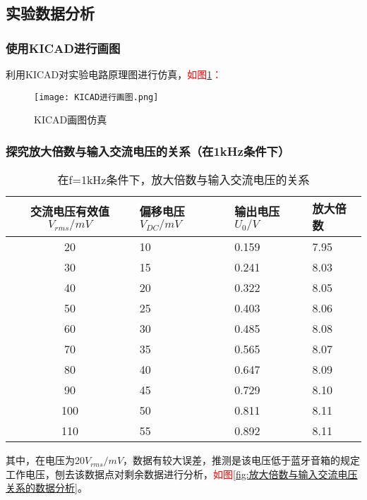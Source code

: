 \documentclass[dvipsnames, svgnames,a4paper,11pt]{article}
\begin{document}
\subsection{实验数据分析}
	\subsubsection{使用KICAD进行画图}
	利用KICAD对实验电路原理图进行仿真，\textcolor{red}{如图\ref{fig:KICAD进行画图}：}

	\begin{figure}[htbp]
		\centering
		\texttt{[image: KICAD进行画图.png]}
		\caption{KICAD画图仿真}
		\label{fig:KICAD进行画图}
	\end{figure}

	\subsubsection{探究放大倍数与输入交流电压的关系（在1kHz条件下）}
	\begin{table}[ht]
		\centering
		\begin{tabularx}{\textwidth}{|c|X|X|X|}
			\hline
			交流电压有效值$V_{rms}/mV$ & 偏移电压$V_{DC}/mV$  & 输出电压$U_0/V$  & 放大倍数 \\
			\hline
			20 & 10 & 0.159&7.95 \\
			\hline
			30 &15 &0.241 & 8.03\\
			\hline
			40& 20& 0.322&8.05 \\
			\hline
			50&25 &0.403 & 8.06\\
			\hline
			60& 30& 0.485& 8.08\\
			\hline
			70&35 & 0.565&8.07 \\
			\hline
			80& 40&0.647 & 8.09\\
			\hline
			90&45 & 0.729& 8.10\\
			\hline
			100 & 50& 0.811& 8.11\\
			\hline
			110&55&0.892&8.11\\
			\hline
		\end{tabularx}
	\caption{在f=1kHz条件下，放大倍数与输入交流电压的关系}
	\label{tab:在f=1kHz条件下，放大倍数与输入交流电压的关系}
		\end{table}
		其中，在电压为20$V_{rms}/mV$，数据有较大误差，推测是该电压低于蓝牙音箱的规定工作电压，刨去该数据点对剩余数据进行分析，\textcolor{red}{如图}\ref{fig:放大倍数与输入交流电压关系的数据分析}。
\end{document}
